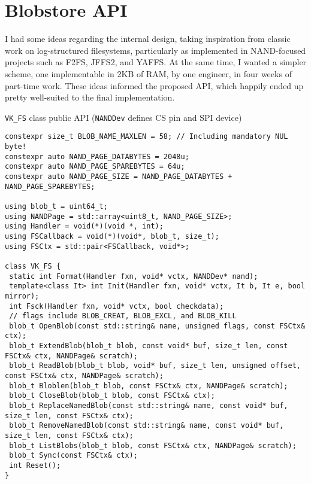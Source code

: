 \documentclass[letterpaper,10pt]{article}
\begin{document}
\section{Blobstore API}
I had some ideas regarding the internal design, taking inspiration from
classic work on log-structured filesystems\parencite{sprite}, particularly
as implemented in NAND-focused projects such as F2FS\parencite{f2fs},
JFFS2\parencite{jffs}, and YAFFS\parencite{yaffs}. At the same time, I wanted
a simpler scheme, one implementable in 2KB of RAM, by one engineer, in four
weeks of part-time work. These ideas informed the proposed API, which happily
ended up pretty well-suited to the final implementation.

\begin{listing}[ht]
\caption{{\texttt{VK\_FS}} class public API ({\texttt{NANDDev}} defines CS pin and SPI device)}
\begin{verbatim}
constexpr size_t BLOB_NAME_MAXLEN = 58; // Including mandatory NUL byte!
constexpr auto NAND_PAGE_DATABYTES = 2048u;
constexpr auto NAND_PAGE_SPAREBYTES = 64u;
constexpr auto NAND_PAGE_SIZE = NAND_PAGE_DATABYTES + NAND_PAGE_SPAREBYTES;

using blob_t = uint64_t;
using NANDPage = std::array<uint8_t, NAND_PAGE_SIZE>;
using Handler = void(*)(void *, int);
using FSCallback = void(*)(void*, blob_t, size_t);
using FSCtx = std::pair<FSCallback, void*>;

class VK_FS {
 static int Format(Handler fxn, void* vctx, NANDDev* nand);
 template<class It> int Init(Handler fxn, void* vctx, It b, It e, bool mirror);
 int Fsck(Handler fxn, void* vctx, bool checkdata);
 // flags include BLOB_CREAT, BLOB_EXCL, and BLOB_KILL
 blob_t OpenBlob(const std::string& name, unsigned flags, const FSCtx& ctx);
 blob_t ExtendBlob(blob_t blob, const void* buf, size_t len, const FSCtx& ctx, NANDPage& scratch);
 blob_t ReadBlob(blob_t blob, void* buf, size_t len, unsigned offset, const FSCtx& ctx, NANDPage& scratch);
 blob_t Bloblen(blob_t blob, const FSCtx& ctx, NANDPage& scratch);
 blob_t CloseBlob(blob_t blob, const FSCtx& ctx);
 blob_t ReplaceNamedBlob(const std::string& name, const void* buf, size_t len, const FSCtx& ctx);
 blob_t RemoveNamedBlob(const std::string& name, const void* buf, size_t len, const FSCtx& ctx);
 blob_t ListBlobs(blob_t blob, const FSCtx& ctx, NANDPage& scratch);
 blob_t Sync(const FSCtx& ctx);
 int Reset();
}
\end{verbatim}
\end{listing}
\end{document}
